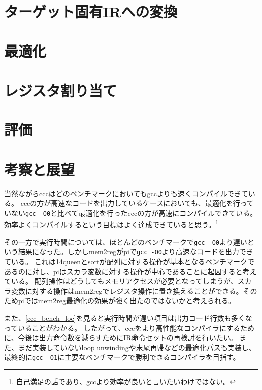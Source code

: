 \documentclass[uplatex,a4paper]{jsarticle}
\begin{document}
\clearpage
\section{ターゲット固有IRへの変換}
\label{archconv}


\clearpage
\section{最適化}
\label{optimization}


\clearpage
\section{レジスタ割り当て}
\label{ccc_regalloc}


\clearpage
\section{評価}
\label{ccc_performance}


\section{考察と展望}

当然ながらcccはどのベンチマークにおいてもgccよりも速くコンパイルできている。
cccの方が高速なコードを出力しているケースにおいても、最適化を行っていない\texttt{gcc -O0}と比べて最適化を行ったcccの方が高速にコンパイルできている。
効率よくコンパイルするという目標はよく達成できていると思う。\footnote{自己満足の話であり、gccより効率が良いと言いたいわけではない。}

その一方で実行時間については、ほとんどのベンチマークで\texttt{gcc -O0}より遅いという結果になった。しかしmem2regがpiで\texttt{gcc -O0}より高速なコードを出力できている。
これは14queenとsortが配列に対する操作が基本となるベンチマークであるのに対し、piはスカラ変数に対する操作が中心であることに起因すると考えている。
配列操作はどうしてもメモリアクセスが必要となってしまうが、スカラ変数に対する操作はmem2regでレジスタ操作に置き換えることができる。そのためpiではmem2reg最適化の効果が強く出たのではないかと考えられる。

また、\cref{ccc_bench_loc}を見ると実行時間が遅い項目は出力コード行数も多くなっていることがわかる。
したがって、cccをより高性能なコンパイラにするために、今後は出力命令数を減らすためにIR命令セットの再検討を行いたい。
また、まだ実装していないloop unwindingや末尾再帰などの最適化パスも実装し、最終的に\texttt{gcc -O1}に主要なベンチマークで勝利できるコンパイラを目指す。
\end{document}
